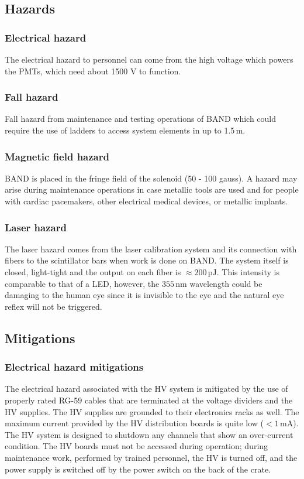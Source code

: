 \subsection{Hazards} 
\indent
\subsubsection{Electrical hazard}
The electrical hazard to personnel can come from the high voltage which powers the PMTs,  which need about 1500 V to function. 

\subsubsection{Fall hazard}
Fall hazard from maintenance and testing operations of BAND which could require the use of ladders to access system elements in up to 1.5\,m. 

\subsubsection{Magnetic field hazard}
BAND is placed in the fringe field of the solenoid (50 - 100 gauss).  A hazard may arise during maintenance operations in case metallic tools are used and for people with cardiac pacemakers,  other electrical medical devices, or metallic implants.

\subsubsection{Laser hazard}
The laser hazard comes from the laser calibration system and its connection with fibers to the scintillator bars when work is done on BAND. The system itself is closed,  light-tight and the output on each fiber is $\approx 200\,\mathrm{pJ}$.  This intensity is comparable to that of a LED, however,  the $355\,\mathrm{nm}$ wavelength could be damaging to the human eye since it is invisible to the eye and the natural eye reflex will not be triggered. 

\subsection{Mitigations}
\indent
\subsubsection{Electrical hazard mitigations} 
The electrical hazard associated with the HV system is mitigated by the use of properly rated RG-59 cables that are terminated at the voltage dividers and the HV supplies.
The HV supplies are grounded to their electronics racks as well. 
The maximum current provided by the HV distribution boards is quite low ($<1\,\mathrm{mA}$).  The HV system is designed to shutdown any channels that show an over-current condition.  The HV boards must not be accessed during operation; during maintenance work,  performed by trained personnel,  the HV is turned off,  and the power supply is switched off by the power switch on the back of the crate.

